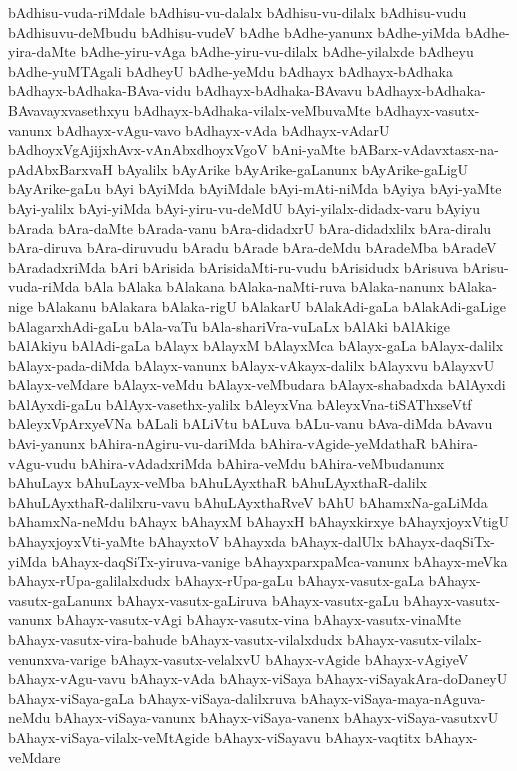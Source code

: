 {bAdhisu-vuda-riMdale
bAdhisu-vu-dalalx
bAdhisu-vu-dilalx
bAdhisu-vudu
bAdhisuvu-deMbudu
bAdhisu-vudeV
bAdhe
bAdhe-yanunx
bAdhe-yiMda
bAdhe-yira-daMte
bAdhe-yiru-vAga
bAdhe-yiru-vu-dilalx
bAdhe-yilalxde
bAdheyu
bAdhe-yuMTAgali
bAdheyU
bAdhe-yeMdu
bAdhayx
bAdhayx-bAdhaka
bAdhayx-bAdhaka-BAva-vidu
bAdhayx-bAdhaka-BAvavu
bAdhayx-bAdhaka-BAvavayxvasethxyu
bAdhayx-bAdhaka-vilalx-veMbuvaMte
bAdhayx-vasutx-vanunx
bAdhayx-vAgu-vavo
bAdhayx-vAda
bAdhayx-vAdarU
bAdhoyxVgAjijxhAvx-vAnAbxdhoyxVgoV
bAni-yaMte
bABarx-vAdavxtasx-na-pAdAbxBarxvaH
bAyalilx
bAyArike
bAyArike-gaLanunx
bAyArike-gaLigU
bAyArike-gaLu
bAyi
bAyiMda
bAyiMdale
bAyi-mAti-niMda
bAyiya
bAyi-yaMte
bAyi-yalilx
bAyi-yiMda
bAyi-yiru-vu-deMdU
bAyi-yilalx-didadx-varu
bAyiyu
bArada
bAra-daMte
bArada-vanu
bAra-didadxrU
bAra-didadxlilx
bAra-diralu
bAra-diruva
bAra-diruvudu
bAradu
bArade
bAra-deMdu
bAradeMba
bAradeV
bAradadxriMda
bAri
bArisida
bArisidaMti-ru-vudu
bArisidudx
bArisuva
bArisu-vuda-riMda
bAla
bAlaka
bAlakana
bAlaka-naMti-ruva
bAlaka-nanunx
bAlaka-nige
bAlakanu
bAlakara
bAlaka-rigU
bAlakarU
bAlakAdi-gaLa
bAlakAdi-gaLige
bAlagarxhAdi-gaLu
bAla-vaTu
bAla-shariVra-vuLaLx
bAlAki
bAlAkige
bAlAkiyu
bAlAdi-gaLa
bAlayx
bAlayxM
bAlayxMca
bAlayx-gaLa
bAlayx-dalilx
bAlayx-pada-diMda
bAlayx-vanunx
bAlayx-vAkayx-dalilx
bAlayxvu
bAlayxvU
bAlayx-veMdare
bAlayx-veMdu
bAlayx-veMbudara
bAlayx-shabadxda
bAlAyxdi
bAlAyxdi-gaLu
bAlAyx-vasethx-yalilx
bAleyxVna
bAleyxVna-tiSAThxseVtf
bAleyxVpArxyeVNa
bALali
bALiVtu
bALuva
bALu-vanu
bAva-diMda
bAvavu
bAvi-yanunx
bAhira-nAgiru-vu-dariMda
bAhira-vAgide-yeMdathaR
bAhira-vAgu-vudu
bAhira-vAdadxriMda
bAhira-veMdu
bAhira-veMbudanunx
bAhuLayx
bAhuLayx-veMba
bAhuLAyxthaR
bAhuLAyxthaR-dalilx
bAhuLAyxthaR-dalilxru-vavu
bAhuLAyxthaRveV
bAhU
bAhamxNa-gaLiMda
bAhamxNa-neMdu
bAhayx
bAhayxM
bAhayxH
bAhayxkirxye
bAhayxjoyxVtigU
bAhayxjoyxVti-yaMte
bAhayxtoV
bAhayxda
bAhayx-dalUlx
bAhayx-daqSiTx-yiMda
bAhayx-daqSiTx-yiruva-vanige
bAhayxparxpaMca-vanunx
bAhayx-meVka
bAhayx-rUpa-galilalxdudx
bAhayx-rUpa-gaLu
bAhayx-vasutx-gaLa
bAhayx-vasutx-gaLanunx
bAhayx-vasutx-gaLiruva
bAhayx-vasutx-gaLu
bAhayx-vasutx-vanunx
bAhayx-vasutx-vAgi
bAhayx-vasutx-vina
bAhayx-vasutx-vinaMte
bAhayx-vasutx-vira-bahude
bAhayx-vasutx-vilalxdudx
bAhayx-vasutx-vilalx-venunxva-varige
bAhayx-vasutx-velalxvU
bAhayx-vAgide
bAhayx-vAgiyeV
bAhayx-vAgu-vavu
bAhayx-vAda
bAhayx-viSaya
bAhayx-viSayakAra-doDaneyU
bAhayx-viSaya-gaLa
bAhayx-viSaya-dalilxruva
bAhayx-viSaya-maya-nAguva-neMdu
bAhayx-viSaya-vanunx
bAhayx-viSaya-vanenx
bAhayx-viSaya-vasutxvU
bAhayx-viSaya-vilalx-veMtAgide
bAhayx-viSayavu
bAhayx-vaqtitx
bAhayx-veMdare
}

